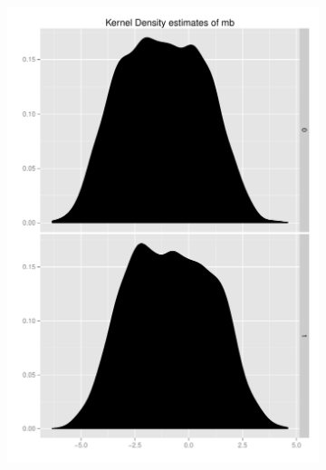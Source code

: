 \documentclass[11pt,letterpaper]{article}
\begin{document}
\begin{landscape}
\begin{figure}[h]
    \begin{subfigure}[b]{0.3\textwidth}\centering \includegraphics[width=1\textwidth]{mb} \end{subfigure}

\end{figure}
\end{landscape}
\end{document}
